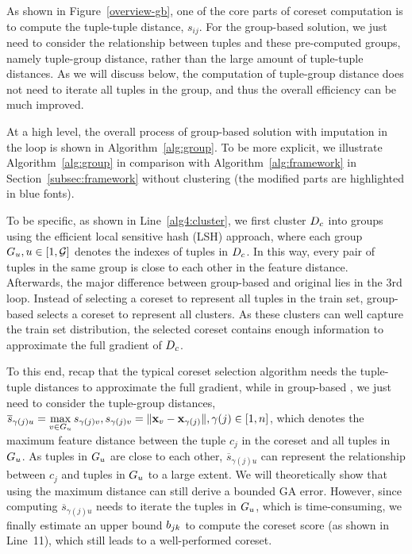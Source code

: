 As shown in Figure~\ref{overview-gb}, one of the core parts of coreset computation is to compute the tuple-tuple distance, \ie $s_{ij}$. For the group-based solution, we just need to consider the relationship between tuples and these pre-computed groups, namely tuple-group distance, rather than the large amount of tuple-tuple distances. As we will discuss below, the computation of tuple-group distance does not need to iterate all tuples in the group, and thus  the overall efficiency can be much improved. 

At a high level, the overall process of group-based \ours solution with imputation in the loop is shown in Algorithm~\ref{alg:group}. To be more explicit, we illustrate Algorithm~\ref{alg:group} in comparison with Algorithm~\ref{alg:framework} in Section~\ref{subsec:framework} without clustering (the modified parts are highlighted in blue fonts).

To be specific, as shown in Line~\ref{alg4:cluster}, we first cluster $D_c$ into groups using the efficient local sensitive hash (LSH) approach, where each group $G_u, u\in[1, \mathcal{G}]$ denotes the indexes of tuples in $D_c$. In this way, every pair of tuples in the same group is close to each other in the feature distance.
%
 Afterwards, the major difference between group-based \ours and original \ours lies in the 3rd loop. Instead of  selecting a coreset to represent all tuples in the train set, group-based \ours selects a coreset to represent all clusters. As these clusters can well capture the train set distribution, the selected coreset contains enough information to approximate the full gradient of $D_c$. 
 
 To this end, recap that the typical coreset selection algorithm needs the tuple-tuple distances to approximate the full gradient, while in group-based \ours, we just need to consider the tuple-group distances, \ie  
$\overline{s}_{\gamma(j)u} = \max\limits_{v \in G_u} s_{\gamma(j)v}, s_{\gamma(j)v} = \lVert\mathbf{x}_v - \mathbf{x}_{\gamma(j)}\rVert, \gamma(j)\in[1, n]$, which denotes the maximum feature distance between the tuple $c_j$ in the coreset and all tuples in $G_u$. As tuples in $G_u$ are close to each other, $\overline{s}_{\gamma(j)u}$ can represent the relationship between $c_j$ and tuples in $G_u$ to a large extent.
%
We will theoretically show that using the maximum distance can still derive a bounded GA error. 
However, since computing $\overline{s}_{\gamma(j)u}$ needs to iterate the tuples in $G_u$, which is time-consuming, we finally estimate an upper bound $b_{jk}$ to compute the coreset score (as shown in Line~11), which still leads to a well-performed coreset. 
%

